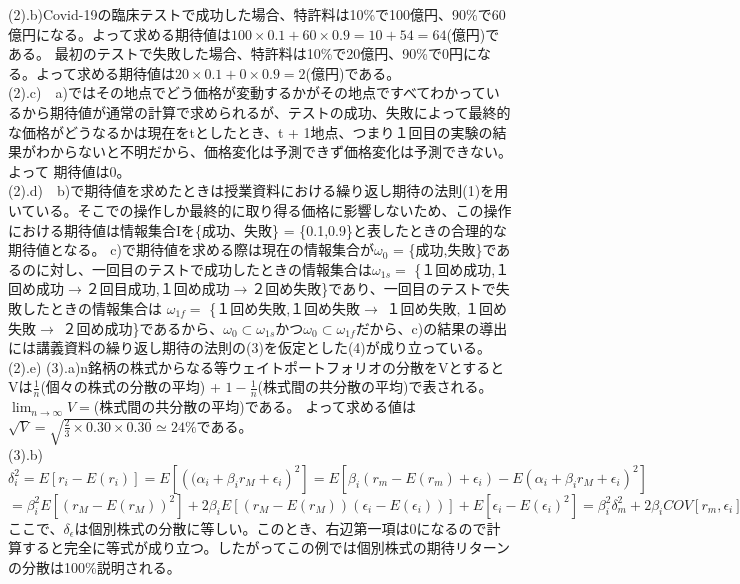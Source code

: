 \documentclass[11pt]{article}
\begin{document}
(2).b)Covid-19の臨床テストで成功した場合、特許料は10\%で100億円、90\%で60億円になる。よって求める期待値は$100 \times 0.1 + 60 \times 0.9 = 10 + 54 = 64$(億円)である。
最初のテストで失敗した場合、特許料は10\%で20億円、90\%で0円になる。よって求める期待値は$20 \times 0.1 + 0 \times 0.9 = 2$(億円)である。\\
(2).c)　a)ではその地点でどう価格が変動するかがその地点ですべてわかっているから期待値が通常の計算で求められるが、テストの成功、失敗によって最終的な価格がどうなるかは現在をtとしたとき、t + 1地点、つまり１回目の実験の結果がわからないと不明だから、価格変化は予測できず価格変化は予測できない。よって
期待値は0。\\
(2).d)　b)で期待値を求めたときは授業資料における繰り返し期待の法則(1)を用いている。そこでの操作しか最終的に取り得る価格に影響しないため、この操作における期待値は情報集合Iを\{成功、失敗\} = \{0.1,0.9\}と表したときの合理的な期待値となる。
c)で期待値を求める際は現在の情報集合が${\omega}_0$ = \{成功,失敗\}であるのに対し、一回目のテストで成功したときの情報集合は${\omega}_{1s} = $ \{１回め成功,１回め成功$\to$２回目成功,１回め成功$\to$２回め失敗\}であり、一回目のテストで失敗したときの情報集合は
${\omega}_{1f} =$ \{１回め失敗,１回め失敗$\to$ １回め失敗, １回め失敗$\to$ ２回め成功\}であるから、${\omega}_0 \subset {\omega}_{1s}$かつ${\omega}_0 \subset {\omega}_{1f}$だから、c)の結果の導出には講義資料の繰り返し期待の法則の(3)を仮定とした(4)が成り立っている。\\
(2).e)
(3).a)n銘柄の株式からなる等ウェイトポートフォリオの分散をVとするとVは$\frac{1}{n}$(個々の株式の分散の平均) + $1 - \frac{1}{n}$(株式間の共分散の平均)で表される。$\lim_{n \rightarrow \infty}V=$(株式間の共分散の平均)である。
よって求める値は$\sqrt{V} = \sqrt{\frac{2}{3} \times 0.30 \times 0.30} \simeq 24 \% $である。\\
(3).b)${\delta}^2_{i} = E[{r_{i} - E(r_{i})}] = E[{({({\alpha}_{i} + {\beta}_ir_M +{\epsilon}_i})}^2] = E[{\beta_i(r_m - E(r_m) + {\epsilon}_i) - E({\alpha}_i + {\beta}_ir_M + {\epsilon}_i)}^2]$\\
$= {\beta}^2_iE[{(r_M - E(r_M))}^2] + 2{\beta}_iE[{(r_M - E(r_M))({\epsilon}_i - E({\epsilon}_i))}] + E[{{\epsilon}_i - E({\epsilon}_i)}^2] = {\beta}^2_i{\delta}^2_m + 2{\beta}_iCOV[r_m,{\epsilon}_i] + {\delta^2}_{\epsilon} = {\beta}_i{\delta}_m + {\delta}_{\epsilon}$\\
ここで、${\delta}_{\epsilon}$は個別株式の分散に等しい。このとき、右辺第一項は0になるので計算すると完全に等式が成り立つ。したがってこの例では個別株式の期待リターンの分散は100\%説明される。\\
\end{document}
